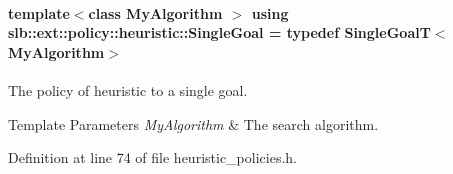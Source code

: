 \paragraph[{\texorpdfstring{Single\+Goal}{SingleGoal}}]{\setlength{\rightskip}{0pt plus 5cm}template$<$class My\+Algorithm $>$ using {\bf slb\+::ext\+::policy\+::heuristic\+::\+Single\+Goal} = typedef {\bf Single\+GoalT}$<$My\+Algorithm$>$}\hypertarget{namespaceslb_1_1ext_1_1policy_1_1heuristic_a6cee0282472a5ca36af95af31fc3513d}{}\label{namespaceslb_1_1ext_1_1policy_1_1heuristic_a6cee0282472a5ca36af95af31fc3513d}


The policy of heuristic to a single goal. 


\begin{DoxyTemplParams}{Template Parameters}
{\em My\+Algorithm} & The search algorithm. \\
\hline
\end{DoxyTemplParams}


Definition at line 74 of file heuristic\+\_\+policies.\+h.

